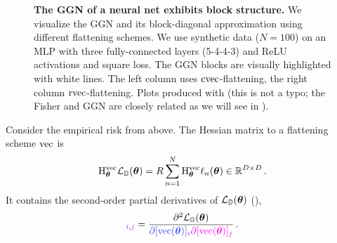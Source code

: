 \begin{figure}[!h]
\begin{minipage}[t]{0.495\linewidth}
  \end{minipage}
  \caption{\textbf{The GGN of a neural net exhibits block structure.}
    We visualize the GGN and its block-diagonal approximation using different flattening schemes.
    We use synthetic data ($N=100$) on an MLP with three fully-connected layers (5-4-4-3) and ReLU activations and square loss.
    The GGN blocks are visually highlighted with white lines.
    The left column uses $\cvec$-flattening, the right column $\rvec$-flattening.
    Plots produced with 
    (this is not a typo; the Fisher and GGN are closely related as we will see in ).
  }
\end{figure}

\switchcolumn[0]
Consider the empirical risk from above.
The Hessian matrix \wrt to a flattening scheme $\vec$ is
\begin{align*}
  \hess_{\vtheta}^{\vec} \gL_{\sD}(\vtheta)
  =
  R
  \sum_{n=1}^N
  \hess_{\vtheta}^{\vec} \ell_n(\vtheta) \in \sR^{D \times D}\,.
\end{align*}
It contains the second-order partial derivatives of $\gL_{\sD}(\vtheta)$ (), \ie
\begin{align*}
  [\hess_{\vtheta}^{\vec} \gL_{\sD}(\vtheta)]_{\colored{i},\colored[VectorPink]{j}}
  =
  \frac{\partial^2 \gL_{\sD}(\vtheta)}{\colored{\partial [\vec(\vtheta)]_i} \colored[VectorPink]{\partial [\vec(\vtheta)]_j}}\,.
\end{align*}

